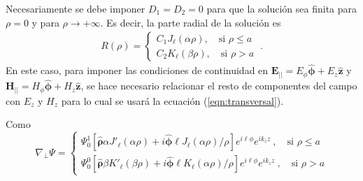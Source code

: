 Necesariamente se debe imponer $D_1 = D_2 = 0$ para que la solución sea finita para $\rho = 0$ y para $\rho \to +\infty$. Es decir, la parte radial de la solución es
\begin{align*}
 R(\rho) = 
	\left\{
	\begin{matrix}	
	C_1 J_\ell (\alpha\rho), \quad \text{si } \rho \le a  
	\\
	C_2 K_\ell (\beta\rho), \quad \text{si } \rho > a  
	\end{matrix}
	\right.
	\ . \nonumber
\end{align*}
En este caso, para imponer las condiciones de continuidad en $\textbf{E}_{||} = E_\phi \boldsymbol{\hat{\phi}} + E_z \hat{\textbf{z}}$ y $\textbf{H}_{||}= H_\phi \hat{\boldsymbol{\phi}} + H_z \hat{\textbf{z}}$, se hace necesario relacionar el resto de componentes del campo con $E_z$ y $H_z$ para lo cual se usará la ecuación (\ref{eqn:transversal}). 

Como 
\begin{equation*}
	\nabla_\perp \Psi =
	\left\{	
	\begin{matrix}
		\Psi_0^1\left[\boldsymbol{\hat{\rho}}\alpha J'_\ell (\alpha \rho) + i \boldsymbol{\hat{\phi}} \ell J_\ell (\alpha \rho)/\rho\right] e^{i\ell\phi} e^{i k_z z} \ , \quad \text{si } \rho \le a  
		\\
		\Psi_0^0\left[\boldsymbol{\hat{\rho}}\beta K'_\ell (\beta\rho) +i \boldsymbol{\hat{\phi}}\ell K_\ell (\alpha \rho)/\rho \right]e^{i\ell\phi} e^{i k_z z} \ , \quad \text{si } \rho > a  
	\end{matrix}
	\right.
\end{equation*}

